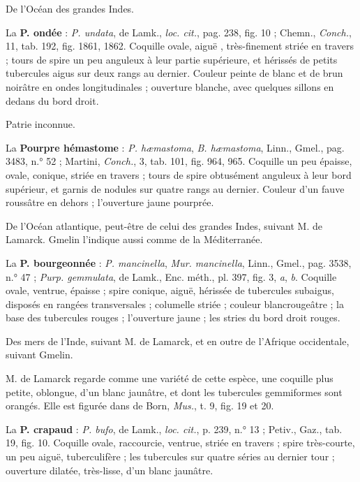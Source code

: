 \documentclass[a4paper, 11pt, oneside, polutonikogreek, french]{article}
\begin{document}
De l'Océan des grandes Indes.

\bigskip

La \textbf{P. ondée} : \emph{P. undata}, de Lamk., \emph{loc. cit.}, pag. 238, fig. 10 ; Chemn., \emph{Conch.}, 11, tab. 192, fig. 1861, 1862. Coquille ovale, aiguë , très-finement striée en travers ; tours de spire un peu anguleux à leur partie supérieure, et hérissés de petits tubercules aigus sur deux rangs au dernier. Couleur peinte de blanc et de brun noirâtre en ondes longitudinales ; ouverture blanche, avec quelques sillons en dedans du bord droit.

Patrie inconnue.

\bigskip

La \textbf{Pourpre hémastome} : \emph{P. hæmastoma}, \emph{B. hæmastoma}, Linn., Gmel., pag. 3483, n.° 52 ; Martini, \emph{Conch.}, 3, tab. 101, fig. 964, 965. Coquille un peu épaisse, ovale, conique, striée en travers ; tours de spire obtusément anguleux à leur bord supérieur, et garnis de nodules sur quatre rangs au dernier. Couleur d'un fauve roussâtre en dehors ; l'ouverture jaune pourprée.

De l'Océan atlantique, peut-être de celui des grandes Indes, suivant M. de Lamarck. Gmelin l'indique aussi comme de la Méditerranée.

\bigskip

La \textbf{P. bourgeonnée} : \emph{P. mancinella}, \emph{Mur. mancinella}, Linn., Gmel., pag. 3538, n.° 47 ; \emph{Purp. gemmulata}, de Lamk., Enc. méth., pl. 397, fig. 3, \emph{a}, \emph{b}. Coquille ovale, ventrue, épaisse ; spire conique, aiguë, hérissée de tubercules subaigus, disposés en rangées transversales ; columelle striée ; couleur blancrougeâtre ; la base des tubercules rouges ; l'ouverture jaune ; les stries du bord droit rouges.

Des mers de l'Inde, suivant M. de Lamarck, et en outre de l'Afrique occidentale, suivant Gmelin.

M. de Lamarck regarde comme une variété de cette espèce, une coquille plus petite, oblongue, d'un blanc jaunâtre, et dont les tubercules gemmiformes sont orangés. Elle est figurée dans de Born, \emph{Mus.}, t. 9, fig. 19 et 20.

\bigskip

La \textbf{P. crapaud} : \emph{P. bufo}, de Lamk., \emph{loc. cit.}, p. 239, n.° 13 ; Petiv., Gaz., tab. 19, fig. 10. Coquille ovale, raccourcie, ventrue, striée en travers ; spire très-courte, un peu aiguë, tuberculifère ; les tubercules sur quatre séries au dernier tour ; ouverture dilatée, très-lisse, d'un blanc jaunâtre.
\end{document}
